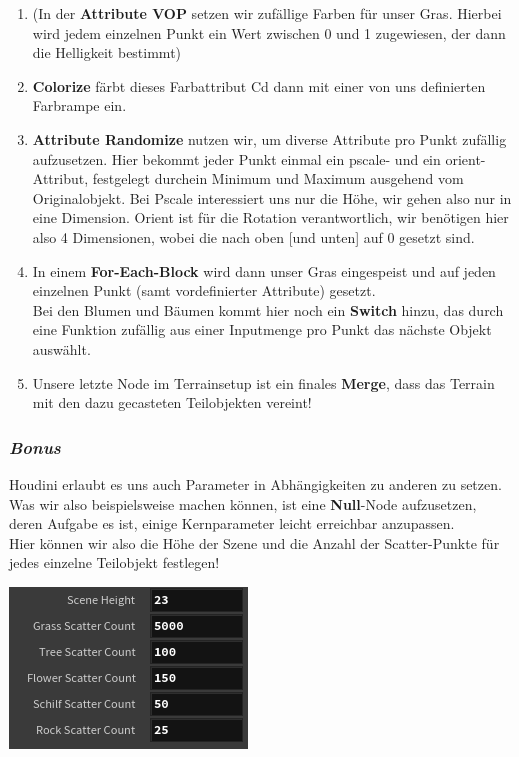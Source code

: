 \documentclass[paper=a4,fontsize=12pt,ngerman]{scrartcl}
\begin{document}
\begin{enumerate}
		\item (In der \textbf{Attribute VOP} setzen wir zufällige Farben für unser Gras. Hierbei wird jedem einzelnen Punkt ein Wert zwischen 0 und 1 zugewiesen, der dann die Helligkeit bestimmt)
		\item \textbf{Colorize} färbt dieses Farbattribut Cd dann mit einer von uns definierten Farbrampe ein.
		\item \textbf{Attribute Randomize} nutzen wir, um diverse Attribute pro Punkt zufällig aufzusetzen. Hier bekommt jeder Punkt einmal ein pscale- und ein orient-Attribut, festgelegt durchein Minimum und Maximum ausgehend vom Originalobjekt. Bei Pscale interessiert uns nur die Höhe, wir gehen also nur in eine Dimension. Orient ist für die Rotation verantwortlich, wir benötigen hier also 4 Dimensionen, wobei die nach oben [und unten] auf 0 gesetzt sind.
		\item In einem \textbf{For-Each-Block} wird dann unser Gras eingespeist und auf jeden einzelnen Punkt (samt vordefinierter Attribute) gesetzt.\\
		Bei den Blumen und Bäumen kommt hier noch ein \textbf{Switch} hinzu, das durch eine Funktion zufällig aus einer Inputmenge pro Punkt das nächste Objekt auswählt.
		\item Unsere letzte Node im Terrainsetup ist ein finales \textbf{Merge}, dass das Terrain mit den dazu gecasteten Teilobjekten vereint!	
	\end{enumerate}
	\subsubsection*{\textit{Bonus}}
	\begin{minipage}{0.7\textwidth}
		Houdini erlaubt es uns auch Parameter in Abhängigkeiten zu anderen zu setzen. Was wir also beispielsweise machen können, ist eine \textbf{Null}-Node aufzusetzen, deren Aufgabe es ist, einige Kernparameter leicht erreichbar anzupassen.\\
		Hier können wir also die Höhe der Szene und die Anzahl der Scatter-Punkte für jedes einzelne Teilobjekt festlegen! 
	\end{minipage}
	\begin{minipage}{0.3\textwidth}
		\includegraphics*[width=\textwidth]{graphics/NedimBonus.png}
	\end{minipage}
\end{document}
